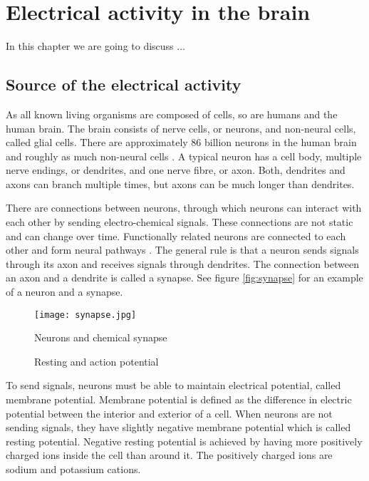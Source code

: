 
\chapter{Electrical activity in the brain}

In this chapter we are going to discuss ...

\section{Source of the electrical activity}
\label{sec:neuron}

As all known living organisms are composed of cells, so are humans and the human brain. The brain consists of nerve cells, or neurons, and non-neural cells, called glial cells. There are approximately 86 billion neurons in the human brain and roughly as much non-neural cells \cite{neuroncount}. A typical neuron has a cell body, multiple nerve endings, or dendrites, and one nerve fibre, or axon. Both, dendrites and axons can branch multiple times, but axons can be much longer than dendrites. 

There are connections between neurons, through which neurons can interact with each other by sending electro-chemical signals. These connections are not static and can change over time. Functionally related neurons are connected to each other and form neural pathways \cite{neuralpathway}. The general rule is that a neuron sends signals through its axon and receives signals through dendrites. The connection between an axon and a dendrite is called a synapse. See figure \ref{fig:synapse} for an example of a neuron and a synapse.

\begin{figure}[b!]
	\begin{minipage}{0.5\textwidth}
		\centering
		\texttt{[image: synapse.jpg]}
		\caption{Neurons and chemical synapse \cite[p.~17]{neuronpic}}
		\label{fig:synapse}
	\end{minipage}
	\begin{minipage}{0.5\textwidth}
		\centering
		\caption{Resting and action potential}
		\label{fig:action_potential}
	\end{minipage}
\end{figure}

To send signals, neurons must be able to maintain electrical potential, called membrane potential. Membrane potential is defined as the difference in electric potential between the interior and exterior of a cell. When neurons are not sending signals, they have slightly negative membrane potential which is called resting potential. Negative resting potential is achieved by having more positively charged ions inside the cell than around it. The positively charged ions are sodium and potassium cations.


